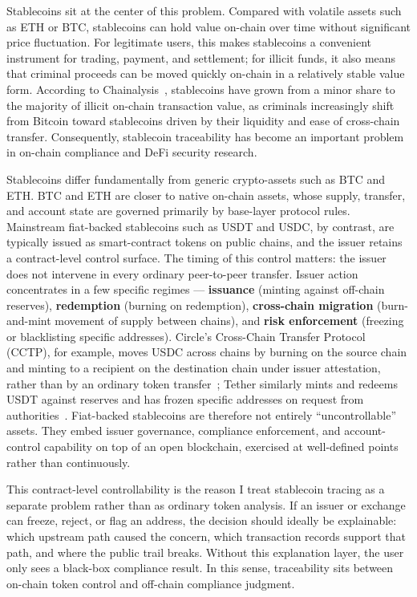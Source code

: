\documentclass[12pt,a4paper]{article}
\begin{document}
Stablecoins sit at the center of this problem. Compared with volatile assets such as ETH or BTC, stablecoins can hold value on-chain over time without significant price fluctuation. For legitimate users, this makes stablecoins a convenient instrument for trading, payment, and settlement; for illicit funds, it also means that criminal proceeds can be moved quickly on-chain in a relatively stable value form. According to Chainalysis~\cite{chainalysis2024}, stablecoins have grown from a minor share to the majority of illicit on-chain transaction value, as criminals increasingly shift from Bitcoin toward stablecoins driven by their liquidity and ease of cross-chain transfer. Consequently, stablecoin traceability has become an important problem in on-chain compliance and DeFi security research.

Stablecoins differ fundamentally from generic crypto-assets such as BTC and ETH. BTC and ETH are closer to native on-chain assets, whose supply, transfer, and account state are governed primarily by base-layer protocol rules. Mainstream fiat-backed stablecoins such as USDT and USDC, by contrast, are typically issued as smart-contract tokens on public chains, and the issuer retains a contract-level control surface. The timing of this control matters: the issuer does not intervene in every ordinary peer-to-peer transfer. Issuer action concentrates in a few specific regimes --- \textbf{issuance} (minting against off-chain reserves), \textbf{redemption} (burning on redemption), \textbf{cross-chain migration} (burn-and-mint movement of supply between chains), and \textbf{risk enforcement} (freezing or blacklisting specific addresses). Circle's Cross-Chain Transfer Protocol (CCTP), for example, moves USDC across chains by burning on the source chain and minting to a recipient on the destination chain under issuer attestation, rather than by an ordinary token transfer~\cite{circleCCTP2026,circleCCTPTechnical2026}; Tether similarly mints and redeems USDT against reserves and has frozen specific addresses on request from authorities~\cite{tetherIssuancePrimer2024,tetherFreeze225m2023}. Fiat-backed stablecoins are therefore not entirely ``uncontrollable'' assets. They embed issuer governance, compliance enforcement, and account-control capability on top of an open blockchain, exercised at well-defined points rather than continuously.

This contract-level controllability is the reason I treat stablecoin tracing as a separate problem rather than as ordinary token analysis. If an issuer or exchange can freeze, reject, or flag an address, the decision should ideally be explainable: which upstream path caused the concern, which transaction records support that path, and where the public trail breaks. Without this explanation layer, the user only sees a black-box compliance result. In this sense, traceability sits between on-chain token control and off-chain compliance judgment.
\end{document}
